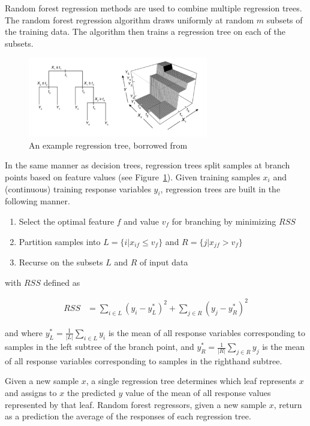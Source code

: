 \documentclass{article} %
\begin{document}
Random forest regression methods are used to combine multiple regression trees. The random forest regression algorithm draws uniformly at random $m$ subsets of the training data. The algorithm then trains a regression tree on each of the subsets.

\begin{figure}[H]
  \centering
  \includegraphics[width=0.7\textwidth]{rf.png}
  \caption{An example regression tree, borrowed from \cite{rffig}}
  \label{fig:regtree}
\end{figure}

In the same manner as decision trees, regression trees split samples at branch points based on feature values (see Figure~\ref{fig:regtree}). Given training samples $x_i$ and (continuous) training response variables $y_i$, regression trees are built in the following manner.

\begin{enumerate}
  \item Select the optimal feature $f$ and value $v_f$ for branching by minimizing $RSS$
  \item Partition samples into $L = \{i | x_{if} \leq v_f\}$ and $R = \{j | x_{jf} > v_f\}$
  \item Recurse on the subsets $L$ and $R$ of input data
\end{enumerate}

with $RSS$ defined as

\begin{align*}
  RSS &= \sum_{i \in L} (y_i - y_L^*)^2 + \sum_{j \in R} (y_j - y_R^*)^2
\end{align*}

and where $y_L^* = \frac{1}{\lvert L \rvert} \sum_{i \in L} y_i $ is the mean of all response variables corresponding to samples in the left subtree of the branch point, and $y_R^* = \frac{1}{\lvert R \rvert} \sum_{j \in R} y_j$ is the mean of all response variables corresponding to samples in the righthand subtree.

Given a new sample $x$, a single regression tree determines which leaf represents $x$ and assigns to $x$ the predicted $y$ value of the mean of all response values represented by that leaf. Random forest regressors, given a new sample $x$, return as a prediction the average of the responses of each regression tree.
\end{document}
